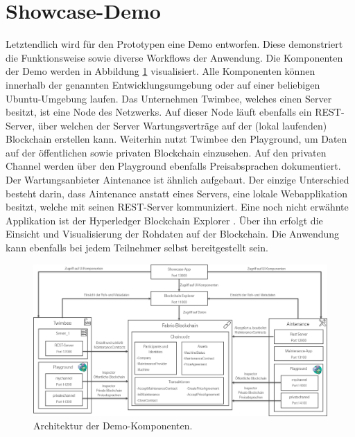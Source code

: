 \section{Showcase-Demo}
Letztendlich wird für den Prototypen eine Demo entworfen. Diese demonstriert die Funktionsweise sowie diverse Workflows der Anwendung. Die Komponenten der Demo werden in Abbildung \ref{fig:architecture-showcase} visualisiert. Alle Komponenten können innerhalb der genannten Entwicklungsumgebung oder auf einer beliebigen Ubuntu-Umgebung laufen. Das Unternehmen Twimbee, welches einen Server besitzt, ist eine Node des Netzwerks. Auf dieser Node läuft ebenfalls ein REST-Server, über welchen der Server Wartungsverträge auf der (lokal laufenden) Blockchain erstellen kann. Weiterhin nutzt Twimbee den Playground, um Daten auf der öffentlichen sowie privaten Blockchain einzusehen. Auf den privaten Channel werden über den Playground ebenfalls Preisabsprachen dokumentiert. Der Wartungsanbieter Aintenance ist ähnlich aufgebaut. Der einzige Unterschied besteht darin, dass Aintenance anstatt eines Servers, eine lokale Webapplikation besitzt, welche mit seinen REST-Server kommuniziert. Eine noch nicht erwähnte Applikation ist der Hyperledger Blockchain Explorer \cite{HyperledgerBlockchainExplorerTeamHyperledgerBlockchainExplorer2018}. Über ihn erfolgt die Einsicht und Visualisierung der Rohdaten auf der Blockchain. Die Anwendung kann ebenfalls bei jedem Teilnehmer selbst bereitgestellt sein.

\begin{figure}[!htbp]
    \centering
      \includegraphics[width=1.0\textwidth,angle=0]{images/architecture_showcase}
       \caption{Architektur der Demo-Komponenten.}
      \label{fig:architecture-showcase}
\end{figure}

